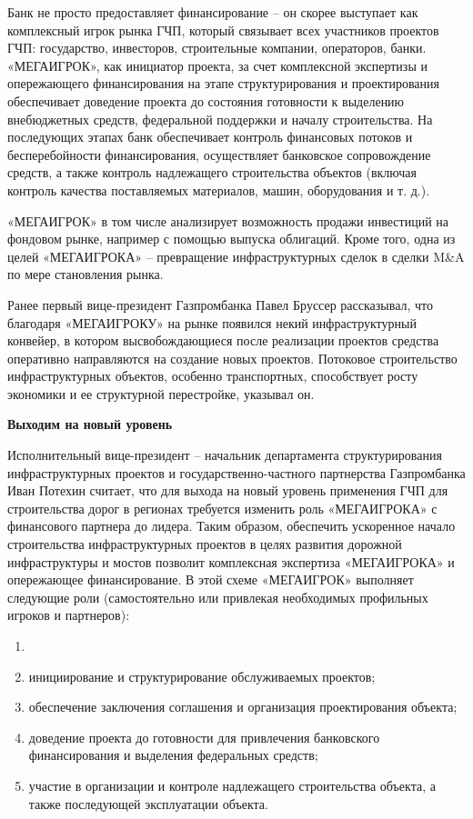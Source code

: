 Банк не просто предоставляет финансирование – он скорее выступает как комплексный игрок рынка ГЧП, который связывает всех участников проектов ГЧП: государство, инвесторов, строительные компании, операторов, банки. «МЕГАИГРОК», как инициатор проекта, за счет комплексной экспертизы и опережающего финансирования на этапе структурирования и проектирования обеспечивает доведение проекта до состояния готовности к выделению внебюджетных средств, федеральной поддержки и началу строительства. На последующих этапах банк обеспечивает контроль финансовых потоков и бесперебойности финансирования, осуществляет банковское сопровождение средств, а также контроль надлежащего строительства объектов (включая контроль качества поставляемых материалов, машин, оборудования и т. д.).

«МЕГАИГРОК» в том числе анализирует возможность продажи инвестиций на фондовом рынке, например с помощью выпуска облигаций. Кроме того, одна из целей «МЕГАИГРОКА» – превращение инфраструктурных сделок в сделки M\&A по мере становления рынка.

Ранее первый вице-президент Газпромбанка Павел Бруссер рассказывал, что благодаря «МЕГАИГРОКУ» на рынке появился некий инфраструктурный конвейер, в котором высвобождающиеся после реализации проектов средства оперативно направляются на создание новых проектов. Потоковое строительство инфраструктурных объектов, особенно транспортных, способствует росту экономики и ее структурной перестройке, указывал он.


\begin{fancyquotes}
    \textbf{Выходим на новый уровень}

    Исполнительный вице-президент – начальник департамента структурирования инфраструктурных проектов и государственно-частного партнерства Газпромбанка Иван Потехин считает, что для выхода на новый уровень применения ГЧП для строительства дорог в регионах требуется изменить роль «МЕГАИГРОКА» с финансового партнера до лидера. Таким образом, обеспечить ускоренное начало строительства инфраструктурных проектов в целях развития дорожной инфраструктуры и мостов позволит комплексная экспертиза «МЕГАИГРОКА» и опережающее финансирование.
    В этой схеме «МЕГАИГРОК» выполняет следующие роли (самостоятельно или привлекая необходимых профильных игроков и партнеров):
    \begin{enumerate}
        \item
        \item инициирование и структурирование обслуживаемых проектов;
        \item обеспечение заключения соглашения и организация проектирования объекта;
        \item доведение проекта до готовности для привлечения банковского финансирования и выделения федеральных средств;
        \item участие в организации и контроле надлежащего строительства объекта, а также последующей эксплуатации объекта.
    \end{enumerate}
\end{fancyquotes}

